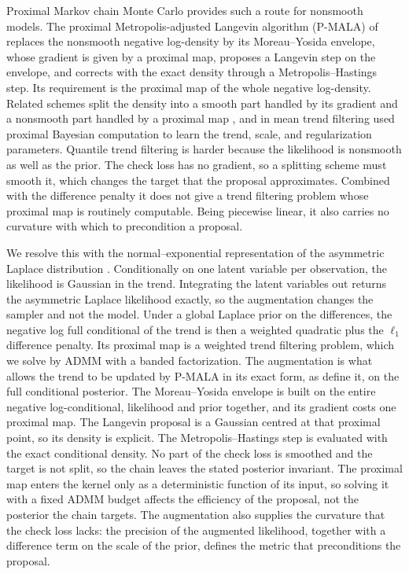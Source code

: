 Proximal Markov chain Monte Carlo provides such a route for nonsmooth models. The proximal Metropolis-adjusted Langevin algorithm (P-MALA) of \citet{pereyra2016proximal} replaces the nonsmooth negative log-density by its Moreau--Yosida envelope, whose gradient is given by a proximal map, proposes a Langevin step on the envelope, and corrects with the exact density through a Metropolis--Hastings step. Its requirement is the proximal map of the whole negative log-density. Related schemes split the density into a smooth part handled by its gradient and a nonsmooth part handled by a proximal map \citep{durmus2018efficient}, and in mean trend filtering \citet{heng2023bayesian} used proximal Bayesian computation to learn the trend, scale, and regularization parameters. Quantile trend filtering is harder because the likelihood is nonsmooth as well as the prior. The check loss has no gradient, so a splitting scheme must smooth it, which changes the target that the proposal approximates. Combined with the difference penalty it does not give a trend filtering problem whose proximal map is routinely computable. Being piecewise linear, it also carries no curvature with which to precondition a proposal.

We resolve this with the normal--exponential representation of the asymmetric Laplace distribution \citep{kozumi2011gibbs}. Conditionally on one latent variable per observation, the likelihood is Gaussian in the trend. Integrating the latent variables out returns the asymmetric Laplace likelihood exactly, so the augmentation changes the sampler and not the model. Under a global Laplace prior on the differences, the negative log full conditional of the trend is then a weighted quadratic plus the $\ell_1$ difference penalty. Its proximal map is a weighted trend filtering problem, which we solve by ADMM with a banded factorization. The augmentation is what allows the trend to be updated by P-MALA in its exact form, as \citet{pereyra2016proximal} define it, on the full conditional posterior. The Moreau--Yosida envelope is built on the entire negative log-conditional, likelihood and prior together, and its gradient costs one proximal map. The Langevin proposal is a Gaussian centred at that proximal point, so its density is explicit. The Metropolis--Hastings step is evaluated with the exact conditional density. No part of the check loss is smoothed and the target is not split, so the chain leaves the stated posterior invariant. The proximal map enters the kernel only as a deterministic function of its input, so solving it with a fixed ADMM budget affects the efficiency of the proposal, not the posterior the chain targets. The augmentation also supplies the curvature that the check loss lacks: the precision of the augmented likelihood, together with a difference term on the scale of the prior, defines the metric that preconditions the proposal.

